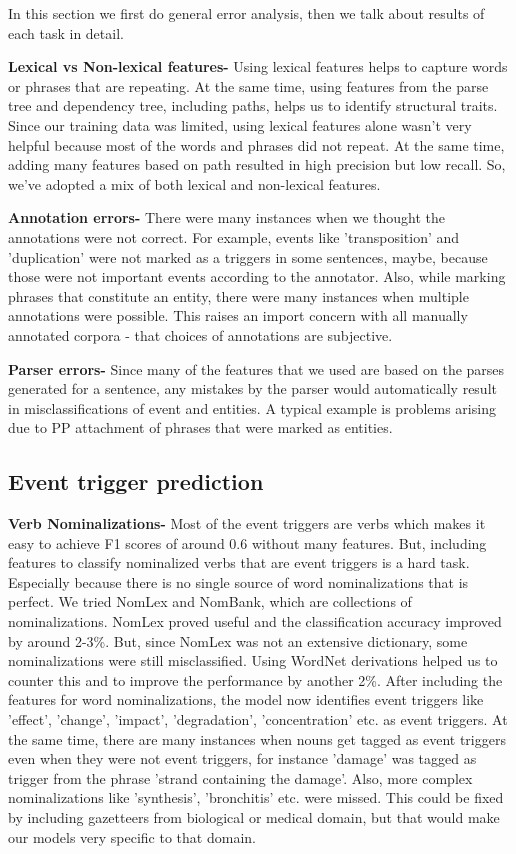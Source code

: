In this section we first do general error analysis, then we talk about results of each task in detail.

{\bf Lexical vs Non-lexical features-} Using lexical features helps to capture words or phrases that are repeating. At the same time, using features from the parse tree and dependency tree, including paths, helps us to identify structural traits. Since our training data was limited, using lexical features alone wasn't very helpful because most of the words and phrases did not repeat. At the same time, adding many features based on path resulted in high precision but low recall. So, we've adopted a mix of both lexical and non-lexical features.

{\bf Annotation errors-} There were many instances when we thought the annotations were not correct. For example, events like 'transposition' and 'duplication' were not marked as a triggers in some sentences, maybe, because those were not important events according to the annotator. Also, while marking phrases that constitute an entity, there were many instances when multiple annotations were possible. This raises an import concern with all manually annotated corpora - that choices of annotations are subjective.

{\bf Parser errors-} Since many of the features that we used are based on the parses generated for a sentence, any mistakes by the parser would automatically result in misclassifications of event and entities. A typical example is problems arising due to PP attachment of phrases that were marked as entities.

\subsection{Event trigger prediction}
{\bf Verb Nominalizations-} Most of the event triggers are verbs which makes it easy to achieve F1 scores of around 0.6 without many features. But, including features to classify nominalized verbs that are event triggers is a hard task. Especially because there is no single source of word nominalizations that is perfect. We tried NomLex and NomBank, which are collections of nominalizations. NomLex proved useful and the classification accuracy improved by around 2-3\%. But, since NomLex was not an extensive dictionary, some nominalizations were still misclassified. Using WordNet derivations helped us to counter this and to improve the performance by another 2\%. After including the features for word nominalizations, the model now identifies event triggers like 'effect', 'change', 'impact', 'degradation', 'concentration' etc. as event triggers. At the same time, there are many instances when nouns get tagged as event triggers even when they were not event triggers, for instance 'damage' was tagged as trigger from the phrase 'strand containing the damage'. Also, more complex nominalizations like 'synthesis', 'bronchitis' etc. were missed. This could be fixed by including gazetteers from biological or medical domain, but that would make our models very specific to that domain.

